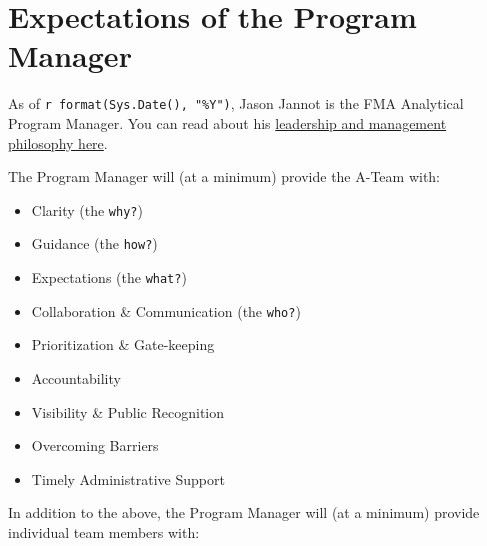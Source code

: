 \documentclass[
  letterpaper,
  DIV=11,
  numbers=noendperiod]{scrreprt}
\providecommand{\tightlist}{%
  \setlength{\itemsep}{0pt}\setlength{\parskip}{0pt}}\usepackage{longtable,booktabs,array}
\begin{document}
\hypertarget{expectations-of-the-program-manager}{%
\section{Expectations of the Program
Manager}\label{expectations-of-the-program-manager}}

As of \texttt{r\ format(Sys.Date(),\ "\%Y")}, Jason Jannot is the FMA
Analytical Program Manager. You can read about his
\protect\hyperlink{sec-jj-philosophy}{leadership and management
philosophy here}.

The Program Manager will (at a minimum) provide the A-Team with:

\begin{itemize}
\tightlist
\item
  Clarity (the \texttt{why?})
\item
  Guidance (the \texttt{how?})\\
\item
  Expectations (the \texttt{what?})\\
\item
  Collaboration \& Communication (the \texttt{who?})
\item
  Prioritization \& Gate-keeping\\
\item
  Accountability\\
\item
  Visibility \& Public Recognition\\
\item
  Overcoming Barriers\\
\item
  Timely Administrative Support
\end{itemize}

In addition to the above, the Program Manager will (at a minimum)
provide individual team members with:
\end{document}
